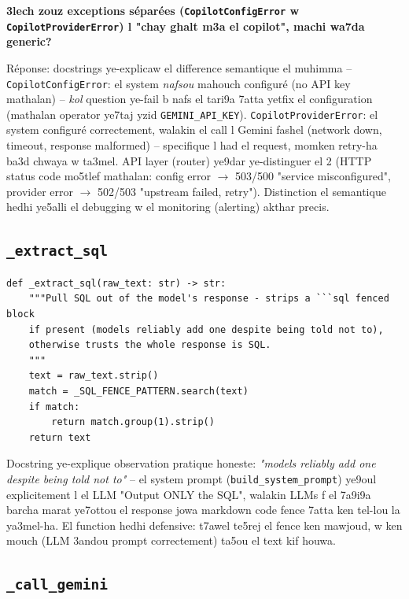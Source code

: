 \documentclass[11pt,a4paper]{report}
\DeclareRobustCommand{\code}[1]{\texttt{#1}}
\begin{document}
\begin{soual}
\textbf{3lech zouz exceptions séparées (\code{CopilotConfigError} w
\code{CopilotProviderError}) l "chay ghalt m3a el copilot", machi wa7da
generic?}

Réponse: docstrings ye-explicaw el difference semantique el muhimma --
\code{CopilotConfigError}: el system \emph{nafsou} mahouch configuré
(no API key mathalan) -- \emph{kol} question ye-fail b nafs el tari9a
7atta yetfix el configuration (mathalan operator ye7taj yzid
\code{GEMINI\_API\_KEY}). \code{CopilotProviderError}: el system
configuré correctement, walakin el call l Gemini fashel (network down,
timeout, response malformed) -- specifique l had el request, momken
retry-ha ba3d chwaya w ta3mel. API layer (router) ye9dar ye-distinguer
el 2 (HTTP status code mo5tlef mathalan: config error $\to$ 503/500
"service misconfigured", provider error $\to$ 502/503 "upstream failed,
retry"). Distinction el semantique hedhi ye5alli el debugging w
el monitoring (alerting) akthar precis.
\end{soual}

\subsection{\code{\_extract\_sql}}

\begin{lstlisting}[style=pystyle]
def _extract_sql(raw_text: str) -> str:
    """Pull SQL out of the model's response - strips a ```sql fenced block
    if present (models reliably add one despite being told not to),
    otherwise trusts the whole response is SQL.
    """
    text = raw_text.strip()
    match = _SQL_FENCE_PATTERN.search(text)
    if match:
        return match.group(1).strip()
    return text
\end{lstlisting}

Docstring ye-explique observation pratique honeste: \emph{"models
reliably add one despite being told not to"} -- el system prompt
(\code{build\_system\_prompt}) ye9oul explicitement l el LLM "Output
ONLY the SQL", walakin LLMs f el 7a9i9a barcha marat ye7ottou el response
jowa markdown code fence 7atta ken tel-lou la ya3mel-ha. El function hedhi
defensive: t7awel te5rej el fence ken mawjoud, w ken mouch (LLM 3andou
prompt correctement) ta5ou el text kif houwa.

\subsection{\code{\_call\_gemini}}
\end{document}
